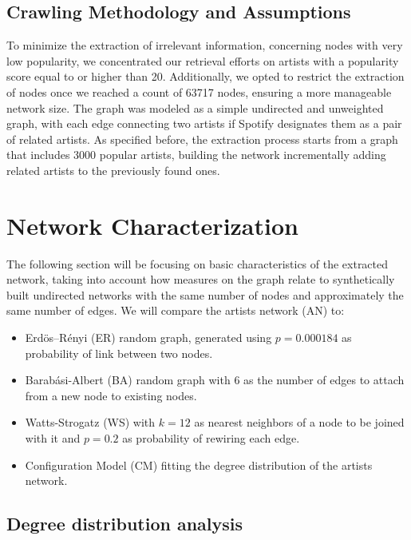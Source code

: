 \documentclass[sigchi]{acmart}
\begin{document}
\subsection{Crawling Methodology and Assumptions}

To minimize the extraction of irrelevant information, concerning nodes with very low popularity, we concentrated our retrieval efforts on artists with a popularity score equal to or higher than 20. Additionally, we opted to restrict the extraction of nodes once we reached a count of 63717 nodes, ensuring a more manageable network size. The graph was modeled as a simple undirected and unweighted graph, with each edge connecting two artists if Spotify designates them as a pair of related artists.  As specified before, the extraction process starts from a graph that includes 3000 popular artists, building the network incrementally adding related artists to the previously found ones.

\section{Network Characterization}

The following section will be focusing on basic characteristics of the extracted network, taking into account how measures on the graph relate to synthetically built undirected networks with the same number of nodes and approximately the same number of edges. We will compare the artists network (AN) to: 

\begin{itemize}
  \item Erdös–Rényi (ER) random graph, generated using $p = 0.000184$ as probability of link between two nodes.
  \item Barabási-Albert (BA) random graph with $6$ as the number of edges to attach from a new node to existing nodes.
  \item Watts-Strogatz (WS) with $k=12$ as nearest neighbors of a node to be joined with it and $p=0.2$ as probability of rewiring each edge.
  \item Configuration Model (CM) fitting the degree distribution of the artists network.
\end{itemize}


\subsection{Degree distribution analysis}
\end{document}
